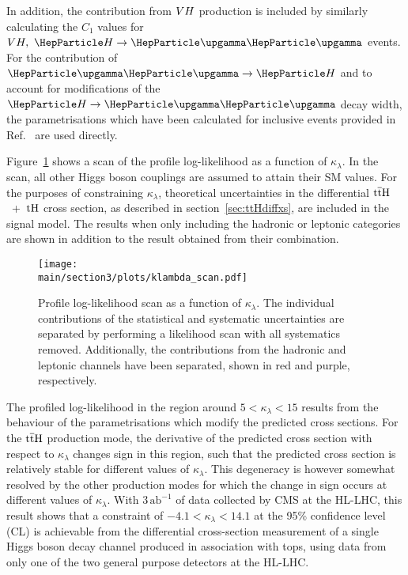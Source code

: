 In addition, the contribution from $VH$ production is included by similarly calculating the $C_{1}$ values for $\VH,~\hgg$ events. For the contribution of $\ggH$ and to account for modifications of the $\hgg$ decay width, the parametrisations which have been calculated for inclusive events provided in Ref.~\cite{Degrassi:2016wml} are used directly.

Figure~\ref{fig:ttHdiff_CMS_klambda_scan} shows a scan of the profile log-likelihood as a function of $\kappa_{\lambda}$. In the scan, all other Higgs boson couplings are assumed to attain their SM values. For the purposes of constraining $\kappa_{\lambda}$, theoretical uncertainties in the differential $\text{t}\overline{\text{t}}\text{H}$~+~$\text{tH}$ cross section, as described in section~\ref{sec:ttHdiffxs}, are included in the signal model. The results when only including the hadronic or leptonic categories are shown in addition to the result obtained from their combination. 

\begin{figure}[htb!]
        \centering
        \texttt{[image: \\main/section3/plots/klambda\_scan.pdf]}
        \caption{Profile log-likelihood scan as a function of $\kappa_\lambda$. The individual contributions of the statistical and systematic uncertainties are separated by performing a likelihood scan with all systematics removed. Additionally, the contributions from the hadronic and leptonic channels have been separated, shown in red and purple, respectively.}
        \label{fig:ttHdiff_CMS_klambda_scan}
\end{figure}


The profiled log-likelihood in the region around 
$5<\kappa_\lambda<15$ results from the behaviour of the parametrisations which modify the predicted cross sections. For the $\text{t}\overline{\text{t}}\text{H}$ production mode, the derivative of the predicted cross section with respect to $\kappa_\lambda$ changes sign in this region, such that the predicted cross section is relatively stable for different values of $\kappa_\lambda$. This degeneracy is however somewhat resolved by the  other production modes for which the change in sign occurs at different values of $\kappa_\lambda$. With $3\,\text{ab}^{-1}$ of data collected by CMS at the HL-LHC, this result shows that a constraint of $-4.1 < \kappa_\lambda < 14.1$ at the 95\% confidence level (CL) is achievable from the differential cross-section measurement of a single Higgs boson decay channel produced in association with tops, using data from only one of the two general purpose detectors at the HL-LHC.  


